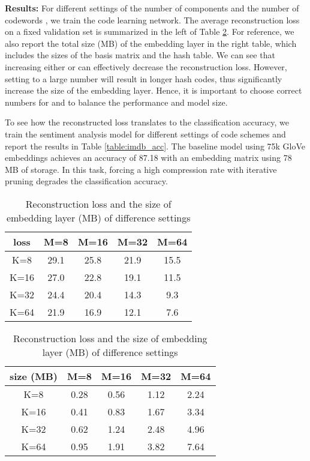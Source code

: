 \documentclass{article} \usepackage{iclr2018_conference_review,times}
\begin{document}
{\bf Results:} \: For different settings of the number of components  and the number of codewords , we train the code learning network. The average reconstruction loss on a fixed validation set is summarized in the left of Table \ref{table:imdb_loss}. For reference, we also report the total size (MB) of the embedding layer in the right table, which includes the sizes of the basis matrix and the hash table. We can see that increasing either  or  can effectively decrease the reconstruction loss. However, setting  to a large number will result in longer hash codes, thus significantly increase the size of the embedding layer. Hence, it is important to choose correct numbers for  and  to balance the performance and model size.



To see how the reconstructed loss translates to the classification accuracy, we train the sentiment analysis model for different settings of code schemes and report the results in Table \ref{table:imdb_acc}. The baseline model using 75k GloVe embeddings achieves an accuracy of 87.18 with an embedding matrix using 78 MB of storage. In this task, forcing a high compression rate with iterative pruning degrades the classification accuracy.

\begin{table}[t]
    \begin{minipage}{.5\linewidth}
    \centering
    
\begin{tabular}{c|cccc}
    \hline \hline
    {loss} & {M=8} & {M=16} & {M=32} & {M=64} \\
    \hline
    {K=8} & 29.1 & 25.8 & 21.9 & 15.5 \\ 
    {K=16} & 27.0 & 22.8 & 19.1 & 11.5 \\ 
    {K=32} & 24.4 & 20.4 & 14.3 & 9.3 \\ 
    {K=64} & 21.9 & 16.9 & 12.1 & 7.6 \\
    \hline \hline
    \end{tabular}


    \end{minipage}\begin{minipage}{.5\linewidth}
      \centering
        
\begin{tabular}{c|cccc}
    \hline \hline
    {size (MB)} & {M=8} & {M=16} & {M=32} & {M=64} \\
    \hline
    {K=8} & 0.28 & 0.56 & 1.12 & 2.24 \\ 
    {K=16} & 0.41 & 0.83 & 1.67 & 3.34 \\ 
    {K=32} & 0.62 & 1.24 & 2.48 & 4.96 \\ 
    {K=64} & 0.95 & 1.91 & 3.82 & 7.64 \\
    \hline \hline
    \end{tabular}


    \end{minipage} 
    \caption{Reconstruction loss and the size of embedding layer (MB) of difference settings}
    \label{table:imdb_loss}
\end{table}
\end{document}
